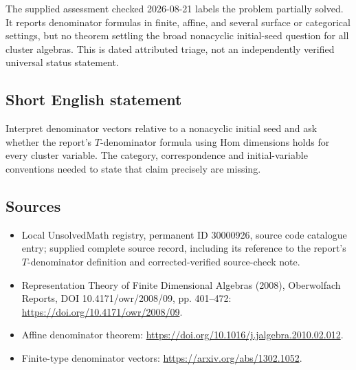 \documentclass[11pt]{article}
\begin{document}
The supplied assessment checked 2026-08-21 labels the problem partially solved. It reports denominator formulas in finite, affine, and several surface or categorical settings, but no theorem settling the broad nonacyclic initial-seed question for all cluster algebras. This is dated attributed triage, not an independently verified universal status statement.
\subsection{Short English statement}
Interpret denominator vectors relative to a nonacyclic initial seed and ask whether the report's $T$-denominator formula using Hom dimensions holds for every cluster variable. The category, correspondence and initial-variable conventions needed to state that claim precisely are missing.
\subsection{Sources}
\begin{itemize}
\item Local UnsolvedMath registry, permanent ID 30000926, source code catalogue entry; supplied complete source record, including its reference to the report's $T$-denominator definition and corrected-verified source-check note.
\item Representation Theory of Finite Dimensional Algebras (2008), Oberwolfach Reports, DOI 10.4171/owr/2008/09, pp. 401--472: \url{https://doi.org/10.4171/owr/2008/09}.
\item Affine denominator theorem: \url{https://doi.org/10.1016/j.jalgebra.2010.02.012}.
\item Finite-type denominator vectors: \url{https://arxiv.org/abs/1302.1052}.
\end{itemize}
\end{document}
